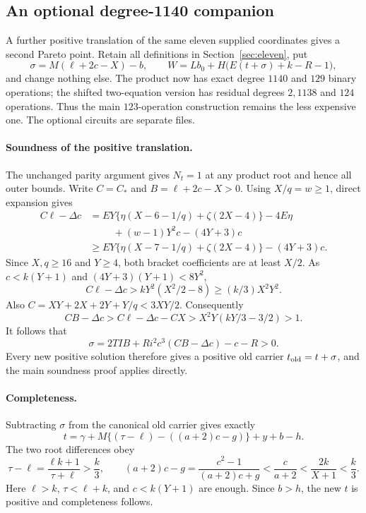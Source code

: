 \subsection{An optional degree-1140 companion}
\label{sec:eleven-optional}

A further positive translation of the same eleven supplied coordinates gives
a second Pareto point. Retain all definitions in Section~\ref{sec:eleven},
put
\[
 \sigma=M(\ell+2c-X)-b,
 \qquad
 W=Lb_0+H\bigl(E(t+\sigma)+k-R-1\bigr),
\]
and change nothing else. The product now has exact degree $1140$ and $129$
binary operations; the shifted two-equation version has residual degrees
$2,1138$ and $124$ operations. Thus the main $123$-operation construction
remains the less expensive one. The optional circuits are separate files.

\paragraph{Soundness of the positive translation.}
The unchanged parity argument gives $N_t=1$ at any product root and hence
all outer bounds. Write $C=C_*$ and $B=\ell+2c-X>0$. Using
$X/q=w\ge1$, direct expansion gives
\begin{align*}
 C\ell-\Delta c
 &=EY\{\eta(X-6-1/q)+\zeta(2X-4)\}-4E\eta\\
 &\hspace{1cm} +(w-1)Y^2c-(4Y+3)c\\
 &\ge EY\{\eta(X-7-1/q)+\zeta(2X-4)\}-(4Y+3)c.
\end{align*}
Since $X,q\ge16$ and $Y\ge4$, both bracket coefficients are at least
$X/2$. As $c<k(Y+1)$ and $(4Y+3)(Y+1)<8Y^2$,
\[
 C\ell-\Delta c>kY^2(X^2/2-8)\ge(k/3)X^2Y^2.
\]
Also $C=XY+2X+2Y+Y/q<3XY/2$. Consequently
\[
 CB-\Delta c>C\ell-\Delta c-CX
 >X^2Y(kY/3-3/2)>1.
\]
It follows that
\[
 \sigma=2TIB+Ri^2c^3(CB-\Delta c)-c-R>0.
\]
Every new positive solution therefore gives a positive old carrier
$t_{\rm old}=t+\sigma$, and the main soundness proof applies directly.

\paragraph{Completeness.}
Subtracting $\sigma$ from the canonical old carrier gives exactly
\[
 t=\gamma+M\{(\tau-\ell)-((a+2)c-g)\}+y+b-h.
\]
The two root differences obey
\[
 \tau-\ell=\frac{\ell k+1}{\tau+\ell}>\frac{k}{3},
 \qquad
 (a+2)c-g=\frac{c^2-1}{(a+2)c+g}
 <\frac{c}{a+2}<\frac{2k}{X+1}<\frac{k}{3}.
\]
Here $\ell>k$, $\tau<\ell+k$, and $c<k(Y+1)$ are enough.
Since $b>h$, the new $t$ is positive and completeness follows.

